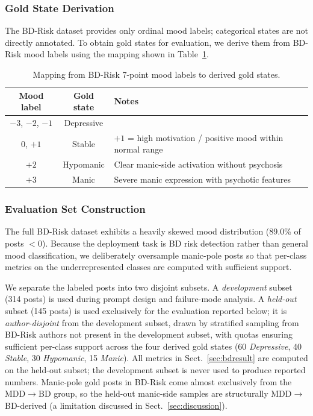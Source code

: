 \documentclass[runningheads]{llncs}
\begin{document}
\subsubsection{Gold State Derivation}
The BD-Risk dataset provides only ordinal mood labels; categorical states are not directly annotated. To obtain gold states for evaluation, we derive them from BD-Risk mood labels using the mapping shown in Table~\ref{tab:mapping}.

\begin{table}[t]
\caption{Mapping from BD-Risk 7-point mood labels to derived gold states.}
\label{tab:mapping}
\centering
\begin{tabular}{ccp{5.2cm}}
\toprule
\textbf{Mood label} & \textbf{Gold state} & \textbf{Notes} \\
\midrule
$-3$, $-2$, $-1$ & Depressive & \\
0, $+1$ & Stable & $+1$ = high motivation / positive mood within normal range \\
$+2$ & Hypomanic & Clear manic-side activation without psychosis \\
$+3$ & Manic & Severe manic expression with psychotic features \\
\bottomrule
\end{tabular}
\end{table}

\subsubsection{Evaluation Set Construction}
The full BD-Risk dataset exhibits a heavily skewed mood distribution (89.0\% of posts $< 0$). Because the deployment task is BD risk detection rather than general mood classification, we deliberately oversample manic-pole posts so that per-class metrics on the underrepresented classes are computed with sufficient support.

We separate the labeled posts into two disjoint subsets. A \emph{development} subset (314 posts) is used during prompt design and failure-mode analysis. A \emph{held-out} subset (145 posts) is used exclusively for the evaluation reported below; it is \emph{author-disjoint} from the development subset, drawn by stratified sampling from BD-Risk authors not present in the development subset, with quotas ensuring sufficient per-class support across the four derived gold states (60 \emph{Depressive}, 40 \emph{Stable}, 30 \emph{Hypomanic}, 15 \emph{Manic}). All metrics in Sect.~\ref{sec:bdresult} are computed on the held-out subset; the development subset is never used to produce reported numbers. Manic-pole gold posts in BD-Risk come almost exclusively from the MDD$\rightarrow$BD group, so the held-out manic-side samples are structurally MDD$\rightarrow$BD-derived (a limitation discussed in Sect.~\ref{sec:discussion}).
\end{document}
